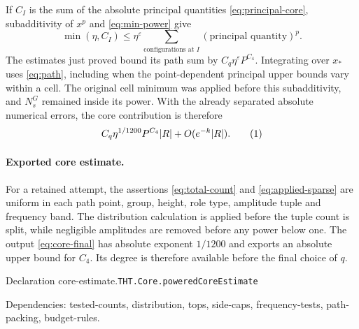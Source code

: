\documentclass[11pt]{article}
\theoremstyle{definition}
\newcommand{\eqtag}[1]{\refstepcounter{equation}\tag{\theequation}\label{#1}}
\numberwithin{equation}{section}
\newcommand{\bp}[3]{\par\smallskip\begingroup\footnotesize
\noindent\hypertarget{bp:#1}{\textsf{Declaration #1.}}\quad\nolinkurl{#2}\par
\noindent\textsf{Dependencies:} #3.\par\endgroup\smallskip}
\begin{document}
If $C_I$ is the sum of the absolute principal quantities \eqref{eq:principal-core}, subadditivity of $x^p$ and \eqref{eq:min-power} give
\[
 \min(\eta,C_I)\le\eta^\varepsilon\sum_{\text{configurations at }I}
 (\text{principal quantity})^p.
\]
The estimates just proved bound its path sum by $C_q\eta^\varepsilon P^{C_4}$. Integrating over $x_*$ uses \eqref{eq:path}, including when the point-dependent principal upper bounds vary within a cell. The original cell minimum was applied before this subadditivity, and $N_s^G$ remained inside its power. With the already separated absolute numerical errors, the core contribution is therefore
\[
 C_q\eta^{1/1200}P^{C_4}|R|+O(e^{-k}|R|).
 \eqtag{eq:core-final}
\]


\paragraph{Exported core estimate.}
For a retained attempt, the assertions \eqref{eq:total-count} and \eqref{eq:applied-sparse} are uniform in each path point, group, height, role type, amplitude tuple and frequency band. The distribution calculation is applied before the tuple count is split, while negligible amplitudes are removed before any power below one. The output \eqref{eq:core-final} has absolute exponent $1/1200$ and exports an absolute upper bound for $C_4$. Its degree is therefore available before the final choice of $q$.
\bp{core-estimate}{THT.Core.poweredCoreEstimate}{tested-counts, distribution, tops, side-caps, frequency-tests, path-packing, budget-rules}
\end{document}
